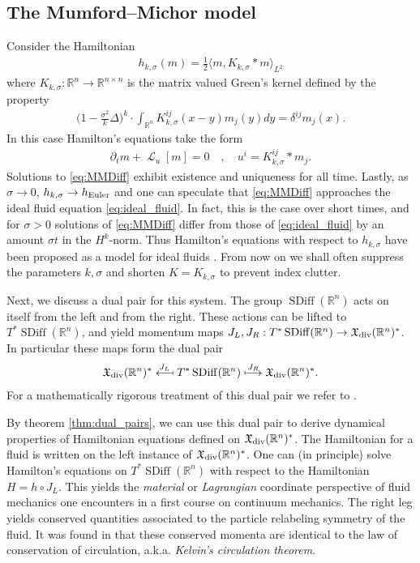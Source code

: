 \documentclass[12pt]{amsart}
\newcommand{\R}{\ensuremath{\mathbb{R}}}
\DeclareMathOperator{\SDiff}{SDiff}
\DeclareMathOperator{\lie}{\mathcal{L}}
\begin{document}
\subsection{The Mumford--Michor model}
\label{sec:MME}
Consider the Hamiltonian
\begin{align*}
  h_{k,\sigma}(m) = \frac{1}{2} \langle m , K_{k,\sigma} * m \rangle_{L^2} 
\end{align*}
where $K_{k,\sigma}:\R^n \to \mathbb{R}^{n \times n}$ is the matrix
valued Green's kernel defined by the property
\begin{align*}
 \Big(1 - \frac{\sigma^2}{k } \Delta \Big)^k \cdot \int_{\R^n} K_{k,\sigma}^{ij}(x - y) m_j(y) dy = \delta^{ij} m_j(x).
\end{align*}
In this case Hamilton's equations take the form
\begin{align}
	\partial_t m+ \lie_u [ m] = 0 \quad , \quad u^i  = K^{ij}_{k,\sigma} * m_j. \label{eq:MMDiff}
\end{align}
Solutions to \eqref{eq:MMDiff} exhibit existence and uniqueness for all time.
Lastly, as $\sigma \to 0$, $h_{k,\sigma} \to h_{\rm Euler}$ and one can speculate that \eqref{eq:MMDiff}
approaches the ideal fluid equation \eqref{eq:ideal_fluid}.
In fact, this is the case over short times, and for $\sigma > 0$ solutions of \eqref{eq:MMDiff}
differ from those of \eqref{eq:ideal_fluid} by an amount $\sigma t$
in the $H^k$-norm.
Thus Hamilton's equations with respect to $h_{k,\sigma}$ have been proposed
as a model for ideal fluids \cite[Theorems 2 and 3]{MumfordMichor2013}. From now on we shall often suppress the
parameters $k,\sigma$ and shorten $K = K_{k,\sigma}$ to prevent index
clutter.

Next, we discuss a dual pair for this system.
The group $\SDiff(\R^n)$ acts on itself from the left and from the right.
These actions can be lifted to $T^* \SDiff(\R^n)$, and yield
momentum maps $J_L,J_R : T^*\SDiff(\R^n) \to \mathfrak{X}_{\rm div}(\R^n)^*$. In particular these maps form the dual pair
\begin{align*}
  \mathfrak{X}_{\rm div}(\R^n)^*
  \stackrel{J_L}{\longmapsfrom}
  T^* \SDiff(\R^n)
  \stackrel{J_R}{\longmapsto}
  \mathfrak{X}_{\rm div}(\R^n)^*.
\end{align*}
For a mathematically rigorous treatment of this dual pair we refer to \cite{GayBalmazVizman2012}.

By theorem \ref{thm:dual_pairs}, we can use this dual pair to derive dynamical properties of Hamiltonian equations defined on $\mathfrak{X}_{\rm div}(\R^n)^*$.
The Hamiltonian for a fluid is written on the left instance of $\mathfrak{X}_{\rm div}(\R^n)^*$.
One can (in principle) solve Hamilton's equations on $T^*\SDiff(\R^n)$
with respect to the Hamiltonian $H = h \circ J_L$.
This yields the \emph{material} or \emph{Lagrangian} coordinate perspective
of fluid mechanics one encounters in a first course on continuum
mechanics.
The right leg yields conserved quantities associated to the particle relabeling symmetry of the fluid.
It was found in \cite{Arnold1966} that these conserved momenta are identical
to the law of conservation of circulation, a.k.a. \emph{Kelvin's circulation theorem}.
\end{document}
